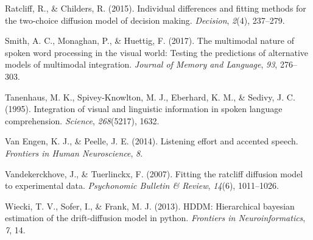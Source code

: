 \documentclass[10pt, letterpaper]{article}
\begin{document}
\hypertarget{ref-ratcliff2015individual}{}
Ratcliff, R., \& Childers, R. (2015). Individual differences and fitting
methods for the two-choice diffusion model of decision making.
\emph{Decision}, \emph{2}(4), 237--279.

\hypertarget{ref-smith2017multimodal}{}
Smith, A. C., Monaghan, P., \& Huettig, F. (2017). The multimodal nature
of spoken word processing in the visual world: Testing the predictions
of alternative models of multimodal integration. \emph{Journal of Memory
and Language}, \emph{93}, 276--303.

\hypertarget{ref-tanenhaus1995integration}{}
Tanenhaus, M. K., Spivey-Knowlton, M. J., Eberhard, K. M., \& Sedivy, J.
C. (1995). Integration of visual and linguistic information in spoken
language comprehension. \emph{Science}, \emph{268}(5217), 1632.

\hypertarget{ref-van2014listening}{}
Van Engen, K. J., \& Peelle, J. E. (2014). Listening effort and accented
speech. \emph{Frontiers in Human Neuroscience}, \emph{8}.

\hypertarget{ref-vandekerckhove2007fitting}{}
Vandekerckhove, J., \& Tuerlinckx, F. (2007). Fitting the ratcliff
diffusion model to experimental data. \emph{Psychonomic Bulletin \&
Review}, \emph{14}(6), 1011--1026.

\hypertarget{ref-wiecki2013hddm}{}
Wiecki, T. V., Sofer, I., \& Frank, M. J. (2013). HDDM: Hierarchical
bayesian estimation of the drift-diffusion model in python.
\emph{Frontiers in Neuroinformatics}, \emph{7}, 14.
\end{document}

